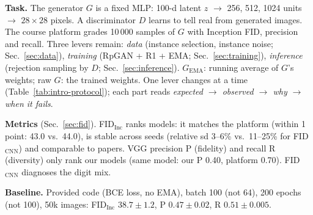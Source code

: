 \textbf{Task.} The generator $G$ is a fixed MLP: 100-d latent $z$ $\to$ 256, 512, 1024 units $\to$ $28{\times}28$ pixels.
A discriminator $D$ learns to tell real from generated images.
The course platform grades 10\,000 samples of $G$ with Inception FID, precision and recall.
Three levers remain: \emph{data} (instance selection, instance noise; Sec.~\ref{sec:data}), \emph{training}
(RpGAN + R1 + EMA; Sec.~\ref{sec:training}), \emph{inference} (rejection sampling by $D$; Sec.~\ref{sec:inference}).
$G_\mathrm{EMA}$: running average of $G$'s weights; raw $G$: the trained weights.
One lever changes at a time (Table~\ref{tab:intro-protocol}); each part reads
\emph{expected $\to$ observed $\to$ why $\to$ when it fails}.

\textbf{Metrics} (Sec.~\ref{sec:fid}). FID$_\text{Inc}$ ranks models: it matches the platform (within
1 point: 43.0 vs.\ 44.0), is stable across seeds (relative sd 3--6\% vs.\ 11--25\% for FID$_\text{CNN}$) and
comparable to papers.
VGG precision P (fidelity) and recall R (diversity) only rank our models (same model: our P 0.40, platform 0.70).
FID$_\text{CNN}$ diagnoses the digit mix.

\textbf{Baseline.} Provided code (BCE loss, no EMA), batch 100 (not 64), 200 epochs (not 100), 50k images:
FID$_\text{Inc}$ $38.7\pm1.2$, P $0.47\pm0.02$, R $0.51\pm0.005$.


